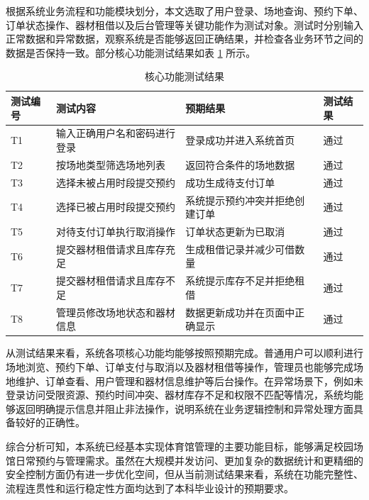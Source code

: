 根据系统业务流程和功能模块划分，本文选取了用户登录、场地查询、预约下单、订单状态操作、器材租借以及后台管理等关键功能作为测试对象。测试时分别输入正常数据和异常数据，观察系统是否能够返回正确结果，并检查各业务环节之间的数据是否保持一致。部分核心功能测试结果如表 \ref{tab:function-test} 所示。

\begin{table}[t]
\centering
\caption{核心功能测试结果}
\label{tab:function-test}
\small
\begin{tabularx}{\textwidth}{p{1.8cm}p{4.6cm}X p{1.8cm}}
\toprule
测试编号 & 测试内容 & 预期结果 & 测试结果 \\
\midrule
T1 & 输入正确用户名和密码进行登录 & 登录成功并进入系统首页 & 通过 \\
T2 & 按场地类型筛选场地列表 & 返回符合条件的场地数据 & 通过 \\
T3 & 选择未被占用时段提交预约 & 成功生成待支付订单 & 通过 \\
T4 & 选择已被占用时段提交预约 & 系统提示预约冲突并拒绝创建订单 & 通过 \\
T5 & 对待支付订单执行取消操作 & 订单状态更新为已取消 & 通过 \\
T6 & 提交器材租借请求且库存充足 & 生成租借记录并减少可借数量 & 通过 \\
T7 & 提交器材租借请求且库存不足 & 系统提示库存不足并拒绝租借 & 通过 \\
T8 & 管理员修改场地状态和器材信息 & 数据更新成功并在页面中正确显示 & 通过 \\
\bottomrule
\end{tabularx}
\end{table}

从测试结果来看，系统各项核心功能均能够按照预期完成。普通用户可以顺利进行场地浏览、预约下单、订单支付与取消以及器材租借等操作，管理员也能够完成场地维护、订单查看、用户管理和器材信息维护等后台操作。在异常场景下，例如未登录访问受限资源、预约时间冲突、器材库存不足和权限不匹配等情况，系统均能够返回明确提示信息并阻止非法操作，说明系统在业务逻辑控制和异常处理方面具备较好的正确性。

综合分析可知，本系统已经基本实现体育馆管理的主要功能目标，能够满足校园场馆日常预约与管理需求。虽然在大规模并发访问、更加复杂的数据统计和更精细的安全控制方面仍有进一步优化空间，但从当前测试结果来看，系统在功能完整性、流程连贯性和运行稳定性方面均达到了本科毕业设计的预期要求。
